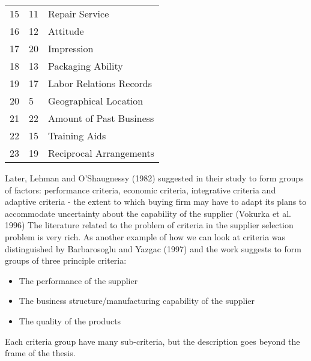 \documentclass[oneside,12pt]{article}%
\begin{document}
\begin{table}[h]
{\begin{tabular}{lll}
    \multicolumn{1}{l|}{15}      & \multicolumn{1}{l|}{11}           & Repair Service \\
    \multicolumn{1}{l|}{16}      & \multicolumn{1}{l|}{12}           & Attitude \\
    \multicolumn{1}{l|}{17}      & \multicolumn{1}{l|}{20}           & Impression \\
    \multicolumn{1}{l|}{18}      & \multicolumn{1}{l|}{13}           & Packaging Ability \\
    \multicolumn{1}{l|}{19}      & \multicolumn{1}{l|}{17}           & Labor Relations Records \\
    \multicolumn{1}{l|}{20}      & \multicolumn{1}{l|}{5}            & Geographical Location \\
    \multicolumn{1}{l|}{21}      & \multicolumn{1}{l|}{22}           & Amount of Past Business \\
    \multicolumn{1}{l|}{22}      & \multicolumn{1}{l|}{15}           & Training Aids \\
    \multicolumn{1}{l|}{23}      & \multicolumn{1}{l|}{19}           & Reciprocal Arrangements
  \end{tabular}
  }
\end{table}

Later, Lehman and O’Shaugnessy (1982) suggested in their study to form groups of factors: performance criteria, economic criteria, integrative criteria and adaptive criteria - the extent to which buying firm may have to adapt its plans to accommodate uncertainty about the capability of the supplier (Vokurka et al. 1996) The literature related to the problem of criteria in the supplier selection problem is very rich. As another example of how we can look at criteria was distinguished by Barbarosoglu and Yazgac (1997) and the work suggests to form groups of three principle criteria:

  \begin{itemize}
    \item The performance of the supplier
    \item The business structure/manufacturing capability of the supplier
    \item The quality of the products
  \end{itemize}

Each criteria group have many sub-criteria, but the description goes beyond the frame of the thesis.
\end{document}
